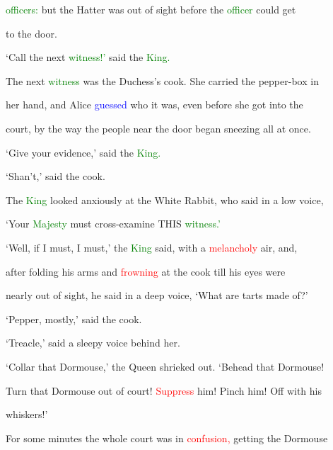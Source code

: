  \textcolor{green}{officers:} but the Hatter was out of sight before the \textcolor{green}{officer} could get

 to the door.



 ‘Call the next \textcolor{green}{witness!’} said the \textcolor{green}{King.}



 The next \textcolor{green}{witness} was the Duchess’s cook. She carried the pepper-box in

 her hand, and Alice \textcolor{blue}{guessed} who it was, even before she got into the

 \textcolor{BurntOrange}{court,} by the way the people near the door began \textcolor{BurntOrange}{sneezing} all at once.



 ‘Give your evidence,’ said the \textcolor{green}{King.}



 ‘Shan’t,’ said the cook.



 The \textcolor{green}{King} looked anxiously at the \textcolor{BurntOrange}{White} Rabbit, who said in a low voice,

 ‘Your \textcolor{green}{Majesty} must cross-examine THIS \textcolor{green}{witness.’}



 ‘Well, if I must, I must,’ the \textcolor{green}{King} said, with a \textcolor{red}{melancholy} air, and,

 after folding his arms and \textcolor{red}{frowning} at the cook till his eyes were

 nearly out of sight, he said in a deep voice, ‘What are tarts made of?’



 ‘Pepper, mostly,’ said the cook.



 ‘Treacle,’ said a sleepy voice behind her.



 ‘Collar that Dormouse,’ the Queen \textcolor{BurntOrange}{shrieked} out. ‘Behead that Dormouse!

 Turn that Dormouse out of \textcolor{BurntOrange}{court!} \textcolor{red}{Suppress} him! Pinch him! Off with his

 whiskers!’



 For some minutes the whole \textcolor{BurntOrange}{court} was in \textcolor{red}{confusion,} getting the Dormouse


